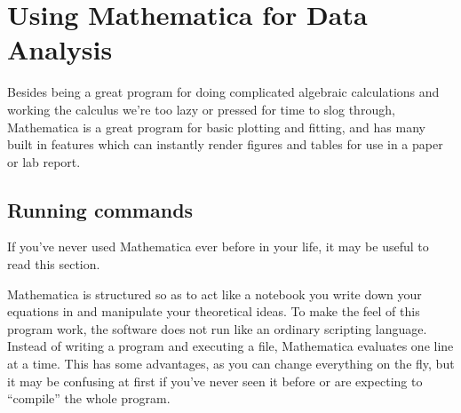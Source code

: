 

\chapter{Using Mathematica for Data Analysis}

Besides being a great program for doing complicated algebraic calculations and working the calculus we're too lazy or pressed for time to slog through, Mathematica is a great program for basic plotting and fitting, and has many built in features which can instantly render figures and tables for use in a paper or lab report.


\section{Running commands}
\begin{remark}
If you've never used Mathematica ever before in your life, it may be useful to read this section.
\end{remark}
Mathematica is structured so as to act like a notebook you write down your equations in and manipulate your theoretical ideas. To make the feel of this program work, the software does not run like an ordinary scripting language. Instead of writing a program and executing a file, Mathematica evaluates one line at a time. This has some advantages, as you can change everything on the fly, but it may be confusing at first if you've never seen it before or are expecting to ``compile'' the whole program.

